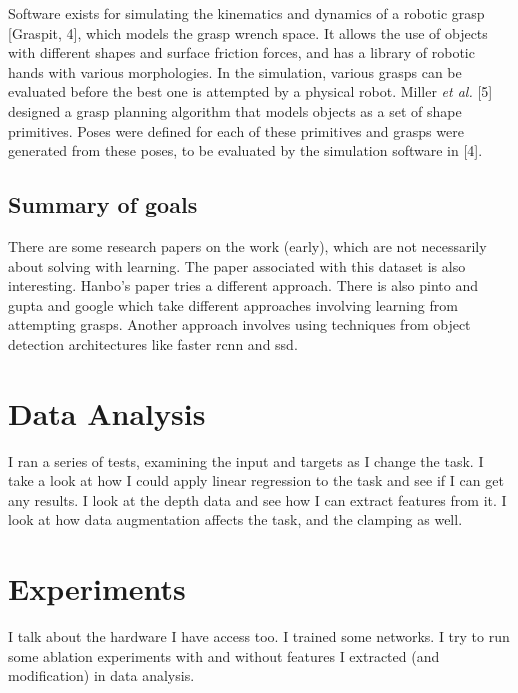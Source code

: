 \documentclass{article}
\begin{document}
Software exists for simulating the kinematics and dynamics of a robotic
grasp [Graspit, 4], which models the grasp wrench space. It allows the use
of objects with different shapes and surface friction forces, and has a library
of robotic hands with various morphologies. In the simulation, various grasps
can be evaluated before the best one is attempted by a physical robot. Miller
\textit{et al.} [5] designed a grasp planning algorithm that models objects as a
set of shape primitives. Poses were defined for each of these primitives and grasps
were generated from these poses, to be evaluated by the simulation software in [4].


\subsection{Summary of goals}
There are some research papers on the work (early), which are not necessarily
about solving with learning.
The paper associated with
this dataset is also interesting. Hanbo's paper tries a different approach.
There is also pinto and gupta and google which take different approaches
involving learning from attempting grasps. Another approach involves using
techniques from object detection architectures like faster rcnn and ssd.


\section{Data Analysis}
I ran a series of tests, examining the input and targets as I change the task.
I take a look at how I could apply linear regression to the task and see if
I can get any results. I look at the depth data and see how I can extract
features from it. I look at how data augmentation affects the task, and the
clamping as well.

\section{Experiments}
I talk about the hardware I have access too. I trained some networks. I try
to run some ablation experiments with and without features I extracted (and
modification) in data analysis.
\end{document}
